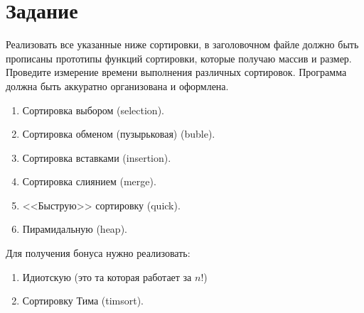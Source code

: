 \documentclass[12pt]{article}
\begin{document}
\section{Задание}

Реализовать все указанные ниже сортировки, в заголовочном файле должно быть прописаны прототипы функций сортировки, которые получаю массив и размер. Проведите измерение времени выполнения различных сортировок. Программа должна быть аккуратно организована и оформлена.

\begin{enumerate}
 \item Сортировка выбором (selection).
 \item Сортировка обменом (пузырьковая) (buble).
 \item Сортировка вставками (insertion).
 \item Сортировка слиянием (merge).
 \item <<Быструю>> сортировку (quick).
 \item Пирамидальную (heap).
\end{enumerate}

Для получения бонуса нужно реализовать:

\begin{enumerate}
 \item Идиотскую (это та которая работает за $n!$)
 \item Сортировку Тима (timsort).
\end{enumerate}
\end{document}
